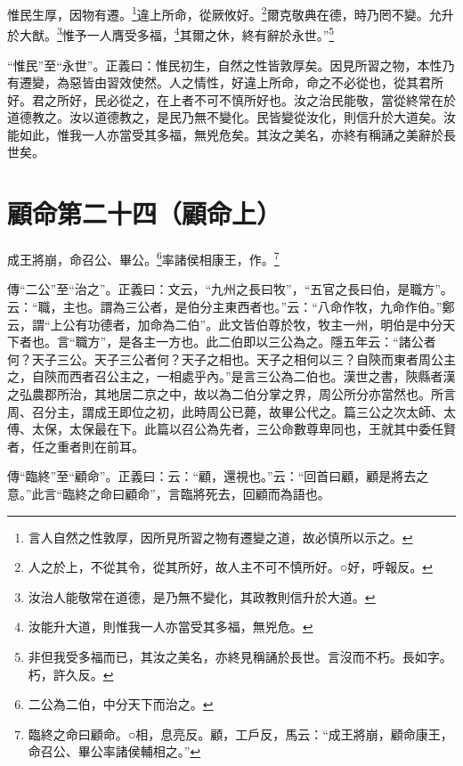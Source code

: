 惟民生厚，因物有遷。\footnote{言人自然之性敦厚，因所見所習之物有遷變之道，故必慎所以示之。}違上所命，從厥攸好。\footnote{人之於上，不從其令，從其所好，故人主不可不慎所好。○好，呼報反。}爾克敬典在德，時乃罔不變。允升於大猷。\footnote{汝治人能敬常在道德，是乃無不變化，其政教則信升於大道。}惟予一人膺受多福，\footnote{汝能升大道，則惟我一人亦當受其多福，無兇危。}其爾之休，終有辭於永世。”\footnote{非但我受多福而已，其汝之美名，亦終見稱誦於長世。言沒而不朽。長如字。朽，許久反。}

{\noindent\shu{}\fzkt “惟民”至“永世”。正義曰：惟民初生，自然之性皆敦厚矣。因見所習之物，本性乃有遷變，為惡皆由習效使然。人之情性，好違上所命，命之不必從也，從其君所好。君之所好，民必從之，在上者不可不慎所好也。汝之治民能敬，當從終常在於道德教之。汝以道德教之，是民乃無不變化。民皆變從汝化，則信升於大道矣。汝能如此，惟我一人亦當受其多福，無兇危矣。其汝之美名，亦終有稱誦之美辭於長世矣。 \par}

\section{顧命第二十四（顧命上）}


成王將崩，命召公、畢公。\footnote{二公為二伯，中分天下而治之。}率諸侯相康王，作。\footnote{臨終之命曰顧命。○相，息亮反。顧，工戶反，馬云：“成王將崩，顧命康王，命召公、畢公率諸侯輔相之。”}


{\noindent\zhuan{}\fzbyks 傳“二公”至“治之”。正義曰：文云，“九州之長曰牧”，“五官之長曰伯，是職方”。云：“職，主也。謂為三公者，是伯分主東西者也。”云：“八命作牧，九命作伯。”鄭云，謂“上公有功德者，加命為二伯”。此文皆伯尊於牧，牧主一州，明伯是中分天下者也。言“職方”，是各主一方也。此二伯即以三公為之。隱五年云：“諸公者何？天子三公。天子三公者何？天子之相也。天子之相何以三？自陝而東者周公主之，自陝而西者召公主之，一相處乎內。”是言三公為二伯也。漢世之書，陝縣者漢之弘農郡所治，其地居二京之中，故以為二伯分掌之界，周公所分亦當然也。所言周、召分主，謂成王即位之初，此時周公已薨，故畢公代之。篇三公之次太師、太傅、太保，太保最在下。此篇以召公為先者，三公命數尊卑同也，王就其中委任賢者，任之重者則在前耳。 \par}

{\noindent\zhuan{}\fzbyks 傳“臨終”至“顧命”。正義曰：云：“顧，還視也。”云：“回首曰顧，顧是將去之意。”此言“臨終之命曰顧命”，言臨將死去，回顧而為語也。 \par}

